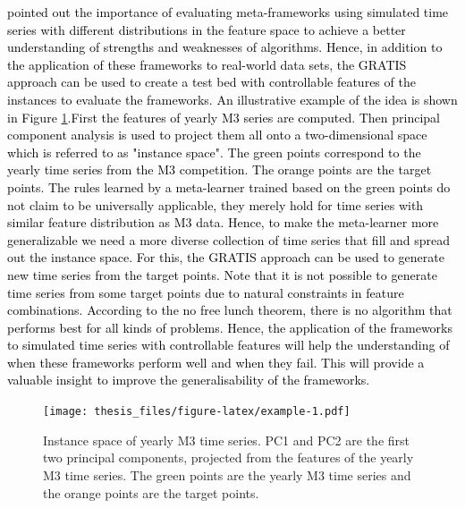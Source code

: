 \documentclass{monashthesis}
\begin{document}
\begin{enumerate}
  \textcite{smith2015generating} \textcolor{black}{pointed out the importance of evaluating meta-frameworks using simulated time series with different distributions in the feature space to achieve a better understanding of strengths and weaknesses of algorithms. Hence, in addition to the application of these frameworks to real-world data sets, the GRATIS} \autocite{kang2019gratis} \textcolor{black}{approach can be used to create a test bed with controllable features of the instances to evaluate the frameworks. An illustrative example of the idea is shown in Figure} \ref{fig:example}\textcolor{black}{.First the features of yearly M3 series are computed. Then principal component analysis is used to project them all onto a two-dimensional space which is referred to as "instance space".  The green points correspond to the yearly time series from the M3 competition. The orange points are the target points. The rules learned by a meta-learner trained based on the green points do not claim to be universally applicable, they merely hold for time series with similar feature distribution as M3 data. Hence, to make the meta-learner more generalizable we need a more diverse collection of time series that fill and spread out the instance space. For this, the GRATIS approach can be used to   generate new time series from the target points. Note that it is not possible to generate time series from some target points due to natural constraints in feature combinations}\autocite{kang2017visualising}\textcolor{black}{. According to the no free lunch theorem, there is no algorithm that performs best for all kinds of problems. Hence, the application of the frameworks to simulated time  series with controllable features will help the understanding of when these frameworks perform well and when they fail. This will provide a valuable insight to improve the generalisability of the frameworks.}
\end{enumerate}

\begin{figure}
\centering
\texttt{[image: thesis\_files/figure-latex/example-1.pdf]}
\caption{\label{fig:example}Instance space of yearly M3 time series. PC1 and PC2 are the first two principal components, projected from the features of the yearly M3 time series. The green points are the yearly M3 time series and the orange points are the target points.}
\end{figure}

\newpage
\end{document}
